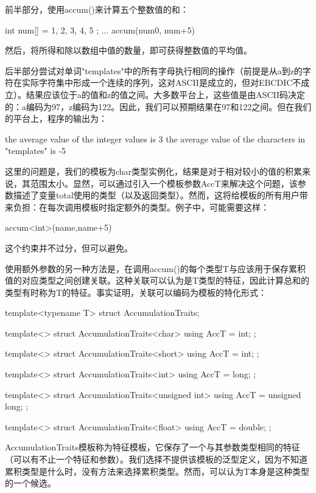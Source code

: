 前半部分，使用accum()来计算五个整数值的和：

\begin{cpp}
int num[] = { 1, 2, 3, 4, 5 };
...
accum(num0, num+5)
\end{cpp}

然后，将所得和除以数组中值的数量，即可获得整数值的平均值。

后半部分尝试对单词"templates"中的所有字母执行相同的操作（前提是从a到z的字符在实际字符集中形成一个连续的序列，这对ASCII是成立的，但对EBCDIC不成立）。结果应该位于a的值和z的值之间。大多数平台上，这些值是由ASCII码决定的：a编码为97，z编码为122。因此，我们可以预期结果在97和122之间。但在我们的平台上，程序的输出为：

\begin{shell}
the average value of the integer values is 3
the average value of the characters in "templates" is -5
\end{shell}

这里的问题是，我们的模板为char类型实例化，结果是对于相对较小的值的积累来说，其范围太小。显然，可以通过引入一个模板参数AccT来解决这个问题，该参数描述了变量total使用的类型（以及返回类型）。然而，这将给模板的所有用户带来负担：在每次调用模板时指定额外的类型。例子中，可能需要这样：

\begin{cpp}
accum<int>(name,name+5)
\end{cpp}

这个约束并不过分，但可以避免。

使用额外参数的另一种方法是，在调用accum()的每个类型T与应该用于保存累积值的对应类型之间创建关联。这种关联可以认为是T类型的特征，因此计算总和的类型有时称为T的特征。事实证明，关联可以编码为模板的特化形式：

\begin{cpp}
template<typename T>
struct AccumulationTraits;

template<>
struct AccumulationTraits<char> {
	using AccT = int;
};

template<>
struct AccumulationTraits<short> {
	using AccT = int;
};

template<>
struct AccumulationTraits<int> {
	using AccT = long;
};

template<>
struct AccumulationTraits<unsigned int> {
	using AccT = unsigned long;
};

template<>
struct AccumulationTraits<float> {
	using AccT = double;
};
\end{cpp}

AccumulationTraits模板称为特征模板，它保存了一个与其参数类型相同的特征（可以有不止一个特征和参数）。我们选择不提供该模板的泛型定义，因为不知道累积类型是什么时，没有方法来选择累积类型。然而，可以认为T本身是这种类型的一个候选。

